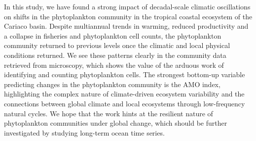 In this study, we have found a strong impact of decadal-scale climatic oscillations on shifts in the phytoplankton community in the tropical coastal ecosystem of the Cariaco basin. Despite multiannual trends in warming, reduced productivity and a collapse in fisheries and phytoplankton cell counts, the phytoplankton community returned to previous levels once the climatic and local physical conditions returned. We see these patterns clearly in the community data retrieved from microscopy, which shows the value of the arduous work of identifying and counting phytoplankton cells. The strongest bottom-up variable predicting changes in the phytoplankton community is the AMO index, highlighting the complex nature of climate-driven ecosystem variability and the connections between global climate and local ecosystems through low-frequency natural cycles. We hope that the work hints at the resilient nature of phytoplankton communities under global change, which should be further investigated by studying long-term ocean time series.





